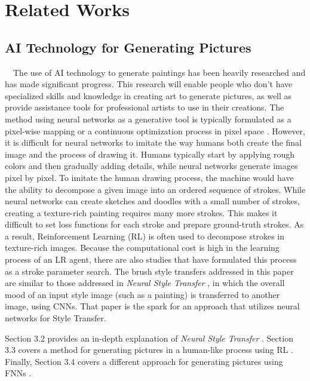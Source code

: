 \chapter{Related Works}

\section{AI Technology for Generating Pictures}
　The use of AI technology to generate paintings has been heavily researched and has 
made significant progress. This research will enable people who don't have specialized 
skills and knowledge in creating art to generate pictures, as well as provide 
assistance tools for professional artists to use in their creations.
The method using neural networks as a generative tool is typically formulated as a 
pixel-wise mapping \cite{DBLP:journals/corr/JohnsonAL16} or a continuous optimization 
process in pixel space \cite{Gatys_2016_CVPR}. However, it is difficult for neural 
networks to imitate the way humans both create the final image and the process of 
drawing it. Humans typically start by applying rough colors and then gradually adding 
details, while neural networks generate images pixel by pixel. To imitate the human 
drawing process, the machine would have the ability to decompose a given image into 
an ordered sequence of strokes. While neural networks can create sketches \cite{DBLP:journals/corr/HaE17, DBLP:journals/corr/abs-1805-00247}
and doodles \cite{DBLP:journals/corr/abs-1810-05977} with a small number of strokes, 
creating a texture-rich painting requires many more strokes. This makes it difficult 
to set loss functions for each stroke and prepare ground-truth strokes. As a result, 
Reinforcement Learning (RL) is often used to decompose strokes in texture-rich images.
\cite{DBLP:journals/corr/abs-1804-01118, DBLP:journals/corr/abs-1206-4634, Huang_2019_ICCV}
Because the computational cost is high in the learning process of an LR agent, there 
are also studies that have formulated this process as a stroke parameter search. 
\cite{liu2021paint} 
The brush style transfers addressed in this paper are similar to those addressed in
\textit{Neural Style Transfer} \cite{Gatys_2016_CVPR}, in which the overall mood of 
an input style image (such as a painting) is transferred to another image, using CNNs.
That paper is the spark for an approach that utilizes neural networks for Style Transfer. 

Section 3.2 provides an in-depth explanation of \textit{Neural Style Transfer} 
\cite{Gatys_2016_CVPR}.
Section 3.3 covers a method for generating pictures in a human-like process using 
RL \cite{Huang_2019_ICCV}.
Finally, Section 3.4 covers a different approach for generating pictures using FNNs
\cite{liu2021paint}.

